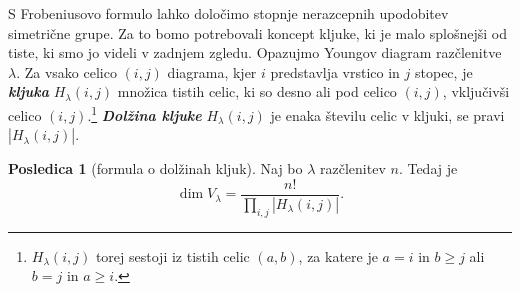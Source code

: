 \documentclass[11pt]{book}
\def\definicija{\color{rdeca}\bf\em}
\theoremstyle{definition}
\theoremstyle{zgled}
\theoremstyle{odprtproblem}
\theoremstyle{domacanaloga}
\theoremstyle{izrek}
\newtheorem*{posledica}{Posledica}
\begin{document}
S Frobeniusovo formulo lahko določimo stopnje nerazcepnih upodobitev simetrične grupe. Za to bomo potrebovali koncept kljuke, ki je malo splošnejši od tiste, ki smo jo videli v zadnjem zgledu. Opazujmo Youngov diagram razčlenitve $\lambda$. Za vsako celico $(i,j)$ diagrama, kjer $i$ predstavlja vrstico in $j$ stopec, je {\definicija kljuka} $H_{\lambda}(i,j)$ množica tistih celic, ki so desno ali pod celico $(i,j)$, vključivši celico $(i,j)$.\footnote{$H_{\lambda}(i,j)$ torej sestoji iz tistih celic $(a,b)$, za katere je $a = i$ in $b \geq j$ ali $b = j$ in $a \geq i$.} {\definicija Dolžina kljuke} $H_{\lambda}(i,j)$ je enaka številu celic v kljuki, se pravi $|H_{\lambda}(i,j)|$.

\begin{posledica}[formula o dolžinah kljuk]
Naj bo $\lambda$ razčlenitev $n$. Tedaj je
\[
    \dim V_{\lambda} = \frac{n!}{\prod_{i,j} |H_{\lambda}(i,j)|}.
\]
\end{posledica}
\end{document}
